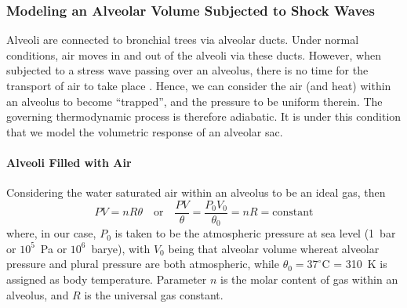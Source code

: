 \subsubsection{Modeling an Alveolar Volume Subjected to Shock Waves}
\label{sec:IdealGasLaw}

Alveoli are connected to bronchial trees via alveolar ducts.  Under normal conditions, air moves in and out of the alveoli via these ducts.  However, when subjected to a stress wave passing over an alveolus, there is no time for the transport of air to take place \cite{Clayton2019TRL,ClaytonFreed20,Clayton2019AIP,claytonBM20}.  Hence, we can consider the air (and heat) within an alveolus to become ``trapped'', and the pressure to be uniform therein.  The governing thermo\-dynamic process is therefore adiabatic.  It is under this condition that we model the volumetric response of an alveolar sac.

\paragraph{Alveoli Filled with Air}

Considering the water saturated air within an alveolus to be an ideal gas, then \cite{Davison08}
\begin{equation}
P V = n \! R \theta
\quad \text{or} \quad
\frac{P V}{\theta} = \frac{P_0 V_0}{\theta_0} = n \! R = \mathrm{constant}
\label{idealGas}
\end{equation}
where, in our case, $P_0$ is taken to be the atmospheric pressure at sea level (1~bar or $10^5$~Pa or $10^6$~barye), with $V_0$ being that alveolar volume whereat alveolar pressure and plural pressure are both atmospheric, while $\theta_0 = 37^{\circ}$C = 310~K is assigned as body temperature.  Parameter $n$ is the molar content of gas within an alveolus, and $R$ is the universal gas constant.  

